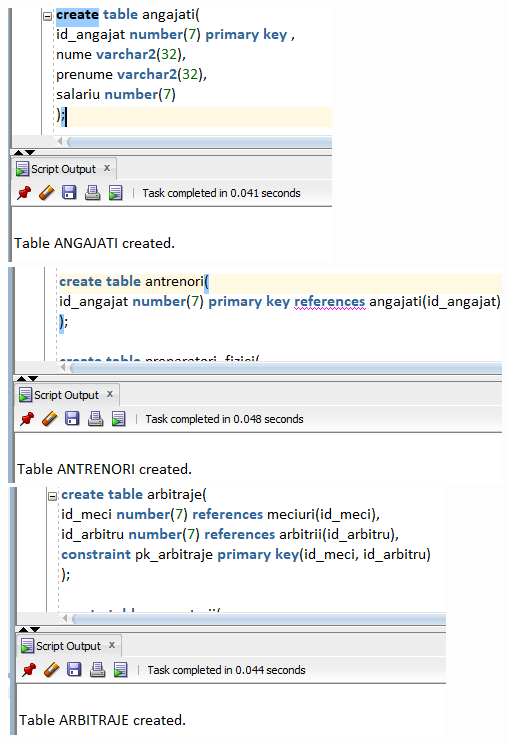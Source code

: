 \documentclass{article}
\begin{document}
\begin{multicols*}{4}

\includegraphics[width=\linewidth]{creation/angajati}
\vspace{4em}
\includegraphics[width=\linewidth]{creation/antrenori}
\vspace{4em}
\includegraphics[width=\linewidth]{creation/arbitraje}

\end{multicols*}
\end{document}
